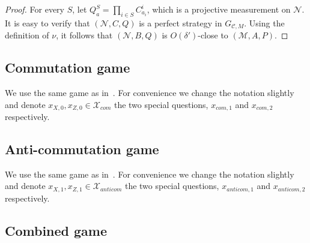 \documentclass[11pt]{article}
\theoremstyle{definition}
\newcommand{\code}{\mathcal{C}}
\DeclareMathOperator*{\Expectation}{\mathbb{E}}
\newcommand{\Es}[1]{\Expectation_{#1}}
\newcommand{\field}{\mathbb{F}_2}
\newcommand{\mM}{\ensuremath{\mathcal{M}}}
\newcommand{\mX}{\ensuremath{\mathcal{X}}}
\newcommand{\mN}{\mathcal{N}}
\begin{document}
\begin{proof}
For every $S$, let $Q^S_a = \prod_{i\in S} C^i_{a_i}$, which is a projective measurement on $\mN$. It is easy to verify that $(\mN,C,Q)$ is a perfect strategy in $G_{\code,M}$. Using the definition of $\nu$, it follows that   $(\mN,B,Q)$ is $O({\delta'})$-close to $(\mM,A,P)$.

\end{proof}


\subsection{Commutation game}
\label{sec:commutation}

We use the same game as in~\cite[Section 3.1]{de2022spectral}. For convenience we change the notation slightly and denote $x_{X,0}, x_{Z,0} \in \mX_{com}$ the two special questions, $x_{com,1}$ and $x_{com,2}$ respectively. 

\subsection{Anti-commutation game}
\label{sec:anticommutation}

We use the same game as in~\cite[Section 3.2]{de2022spectral}. For convenience we change the notation slightly and  denote $x_{X,1}, x_{Z,1} \in \mX_{anticom}$ the two special questions, $x_{anticom,1}$ and $x_{anticom,2}$ respectively. 

\subsection{Combined game}
\end{document}
